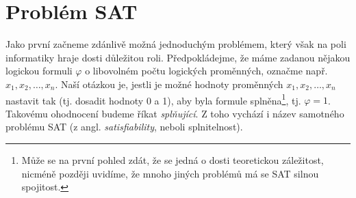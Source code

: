\section{Problém SAT}\label{sec:sat}

Jako první začneme zdánlivě možná jednoduchým problémem, který však na poli informatiky hraje dosti důležitou roli. Předpokládejme, že máme zadanou nějakou logickou formuli $\varphi$ o libovolném počtu logických proměnných, označme např. $x_1,x_2,\dots,x_n$. Naší otázkou je, jestli je možné hodnoty proměnných $x_1,x_2,\dots,x_n$ nastavit tak (tj. dosadit hodnoty 0 a 1), aby byla formule splněna\footnote{Může se na první pohled zdát, že se jedná o dosti teoretickou záležitost, nicméně později uvidíme, že mnoho jiných problémů má se SAT silnou spojitost.}, tj. $\varphi=1$. Takovému ohodnocení budeme říkat \emph{splňující}. Z toho vychází i název samotného problému SAT (z angl. \emph{satisfiability}, neboli splnitelnost).


